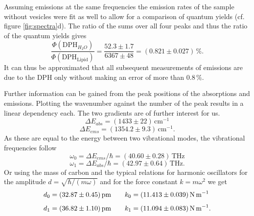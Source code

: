 \documentclass{scrartcl}
\numberwithin{equation}{section}
\numberwithin{figure}{section}
\numberwithin{table}{section}
\newcommand{\eq}[2]{\begin{equation}#1\label{#2}\end{equation}}
\begin{document}
Assuming emissions at the same frequencies the emission rates of the sample without vesicles were fit as well to allow for a comparison of quantum yields (cf. figure \ref{fig:spectra}d). The ratio of the sums over all four peaks and thus the ratio of the quantum yields gives
\eq{\frac{\Phi(\text{DPH}_{H_2 O})}{\Phi(\text{DPH}_{\text{Lipid}})} = \frac{52.3\pm 1.7}{6367\pm 48} = (0.821\pm 0.027)\,\% . }{}
It can thus be approximated that all subsequent measurements of emissions are due to the DPH only without making an error of more than $0.8\,\%$.

Further information can be gained from the peak positions of the absorptions and emissions. Plotting the wavenumber against the number of the peak results in a linear dependency each. The two gradients are of further interest for us.
\eq{ \Delta E_{abs} = (1433\pm 22)\,\text{cm}^{-1} }{}
\eq{ \Delta E_{ems} = (1354.2\pm 9.3)\,\text{cm}^{-1} . }{}
As these are equal to the energy between two vibrational modes, the vibrational frequencies follow
\eq{ \omega_0 = \Delta E_{ems} / \hbar = (40.60\pm 0.28)\,\text{THz} }{}
\eq{ \omega_1 = \Delta E_{abs} / \hbar = (42.97\pm 0.64)\,\text{THz} . }{}
Or using the mass of carbon and the typical relations for harmonic oscillators for the amplitude $d=\sqrt{\hbar / (m\omega)}$ and for the force constant $k=m\omega^2$ we get
\eq{ d_0 = (32.87\pm  0.45)\,\text{pm} \qquad k_0 = (11.413\pm 0.039)\,\text{N\,m}^{-1}\;}{}
\eq{ d_1 = (36.82\pm  1.10)\,\text{pm} \qquad k_1 = (11.094\pm 0.083)\,\text{N\,m}^{-1} .}{}




\clearpage
 

\end{document}
